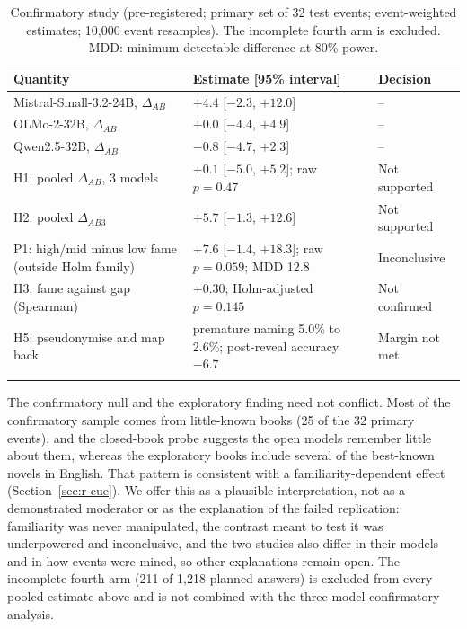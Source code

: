 \documentclass[sn-mathphys]{sn-jnl}%
\theoremstyle{thmstyleone}%
\theoremstyle{thmstyletwo}%
\theoremstyle{thmstylethree}%
\begin{document}
\begin{table}[!t]
\caption{Confirmatory study (pre-registered; primary set of 32 test events; event-weighted estimates; 10,000 event resamples). The incomplete fourth arm is excluded. MDD: minimum detectable difference at 80\% power.}\label{tab:confirm}
\footnotesize
\begin{tabular*}{\textwidth}{@{\extracolsep\fill}p{4.4cm}p{4.6cm}p{2.4cm}}
\toprule
Quantity & Estimate [95\% interval] & Decision \\
\midrule
Mistral-Small-3.2-24B, $\Delta_{AB}$ & $+4.4$ [$-2.3$, $+12.0$] & -- \\
OLMo-2-32B, $\Delta_{AB}$ & $+0.0$ [$-4.4$, $+4.9$] & -- \\
Qwen2.5-32B, $\Delta_{AB}$ & $-0.8$ [$-4.7$, $+2.3$] & -- \\
\midrule
H1: pooled $\Delta_{AB}$, 3 models & $+0.1$ [$-5.0$, $+5.2$]; raw $p=0.47$ & Not supported \\
H2: pooled $\Delta_{AB3}$ & $+5.7$ [$-1.3$, $+12.6$] & Not supported \\
P1: high/mid minus low fame (outside Holm family) & $+7.6$ [$-1.4$, $+18.3$]; raw $p=0.059$; MDD 12.8 & Inconclusive \\
H3: fame against gap (Spearman) & $+0.30$; Holm-adjusted $p=0.145$ & Not confirmed \\
H5: pseudonymise and map back & premature naming 5.0\% to 2.6\%; post-reveal accuracy $-6.7$ & Margin not met \\
\botrule
\end{tabular*}
\end{table}

The confirmatory null and the exploratory finding need not conflict. Most of the confirmatory sample comes from little-known books (25 of the 32 primary events), and the closed-book probe suggests the open models remember little about them, whereas the exploratory books include several of the best-known novels in English. That pattern is consistent with a familiarity-dependent effect (Section~\ref{sec:r-cue}). We offer this as a plausible interpretation, not as a demonstrated moderator or as the explanation of the failed replication: familiarity was never manipulated, the contrast meant to test it was underpowered and inconclusive, and the two studies also differ in their models and in how events were mined, so other explanations remain open. The incomplete fourth arm (211 of 1,218 planned answers) is excluded from every pooled estimate above and is not combined with the three-model confirmatory analysis.
\end{document}
